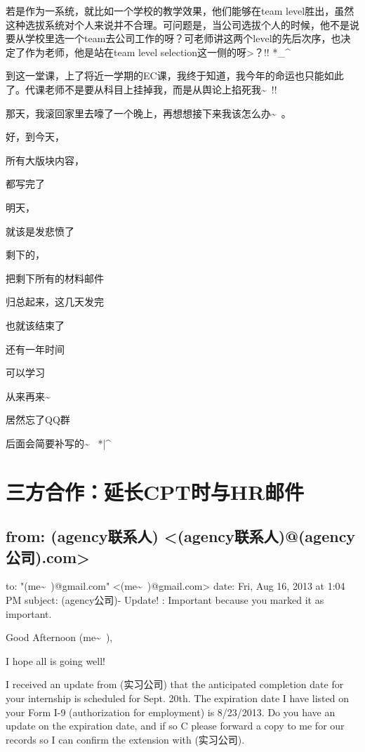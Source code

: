 \documentclass[12pt]{book}
\begin{document}
若是作为一系统，就比如一个学校的教学效果，他们能够在team level胜出，虽然这种选拔系统对个人来说并不合理。可问题是，当公司选拔个人的时候，他不是说要从学校里选一个team去公司工作的呀？可老师讲这两个level的先后次序，也决定了作为老师，他是站在team level selection这一侧的呀>？!! *\_\^{}

到这一堂课，上了将近一学期的EC课，我终于知道，我今年的命运也只能如此了。代课老师不是要从科目上挂掉我，而是从舆论上掐死我\textasciitilde{}~!! 

那天，我滚回家里去嚎了一个晚上，再想想接下来我该怎么办\textasciitilde{}~。

好，到今天，

所有大版块内容，

都写完了

明天，

就该是发悲愤了

剩下的，

把剩下所有的材料邮件

归总起来，这几天发完

也就该结束了

还有一年时间

可以学习

从来再来\textasciitilde{}~

居然忘了QQ群

后面会简要补写的\textasciitilde{}~ *|\^{}

\chapter{三方合作：延长CPT时与HR邮件}
\label{sec-35}

\section{from:         (agency联系人) <(agency联系人)@(agency公司).com>}
\label{sec-35-1}
to:         "(me\textasciitilde{}~)@gmail.com" <(me\textasciitilde{}~)@gmail.com>
date:         Fri, Aug 16, 2013 at 1:04 PM
subject:         (agency公司)- Update!
:         Important because you marked it as important.

Good Afternoon (me\textasciitilde{}~),

I hope all is going well!

I received an update from (实习公司) that the anticipated completion date for your internship is scheduled for Sept. 20th. The expiration date I have listed on your Form I-9 (authorization for employment) is 8/23/2013. Do you have an update on the expiration date, and if so C please forward a copy to me for our records so I can confirm the extension with (实习公司).
\end{document}
